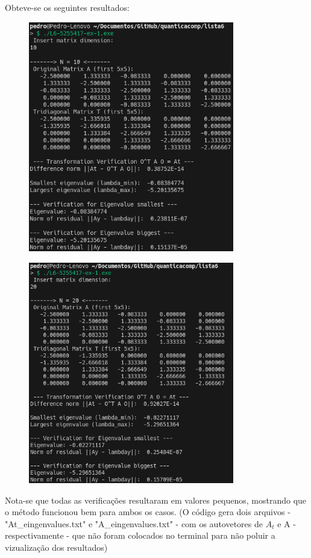 \documentclass[12pt, a4paper]{article} %
\begin{document}
        Obteve-se os seguintes resultados:
        \begin{figure}[H]
            \centering
            \includegraphics[width=0.8\textwidth]{../images/ex1-10.png}
        \end{figure}
        \begin{figure}[H]
            \centering
            \includegraphics[width=0.8\textwidth]{../images/ex1-20.png}
        \end{figure}

        Nota-se que todas as verifica\c{c}\~oes resultaram em valores pequenos, mostrando que o m\'etodo funcionou bem para ambos os casos.
        (O c\'odigo gera dois arquivos - "At\_eingenvalues.txt" e "A\_eingenvalues.txt" - com os autovetores de $A_t$ e A - respectivamente - que n\~ao foram colocados no terminal para n\~ao poluir a vizualiza\c{c}\~ao dos resultados)
\end{document}
